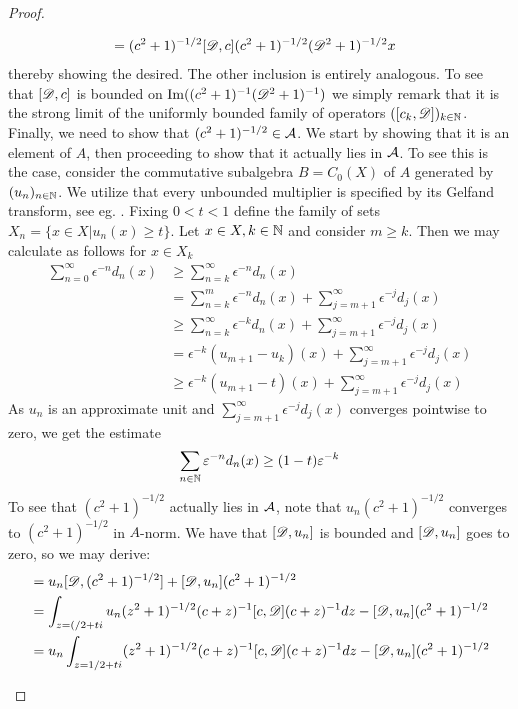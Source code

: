 \begin{proof}
\begin{itemize}
\begin{align*}
			&=(c^2+1)^{-1/2}[\mathscr{D},c](c^2+1)^{-1/2}(\mathscr{D}^2+1)^{-1/2}x
		\end{align*}
		thereby showing the desired. The other inclusion is entirely analogous. 
		To see that $[\mathscr{D},c]$ is bounded on $\operatorname{Im}((c^2+1)^{-1}(\mathscr{D}^2+1)^{-1})$ we simply remark that it is the strong limit of the uniformly bounded family of operators $([c_k,\mathscr{D}])_{k\in \mathbb{N}}$.
		Finally, we need to show that $(c^2+1)^{-1/2}\in \mathcal{A}$. We start by showing that it is an element of $A$, then proceeding to show that it actually lies in $\mathcal{A}$. To see this is the case, consider the commutative subalgebra $B=C_0(X)$ of $A$ generated by $(u_n)_{n\in \mathbb{N}}$. We utilize that every unbounded multiplier is specified by its Gelfand transform, see eg. \cite[Theorem 2.1,Theorem 2.3]{wood}.%
		Fixing $0<t<1$ define the family of sets $X_n=\{x\in X| u_n(x)\geq t\}$. Let $x\in X,k\in \mathbb{N}$ and consider $m\geq k$. Then we may calculate as follows for $x\in X_k$
		\begin{align*}
			\sum_{n=0}^\infty \epsilon^{-n}d_n(x)&\geq \sum_{n=k}^\infty \epsilon^{-n}d_n(x)  \\
			&=\sum_{n=k}^m \epsilon^{-n}d_n(x)+\sum_{j=m+1}^\infty \epsilon^{-j}d_j(x) \\ 
			&\geq \sum_{n=k}^\infty \epsilon^{-k}d_n(x) + \sum_{j=m+1}^\infty \epsilon^{-j}d_j(x)\\
			&=\epsilon^{-k}(u_{m+1}-u_k)(x)+\sum_{j=m+1}^\infty \epsilon^{-j}d_j(x) \\ 
			&\geq \epsilon^{-k}(u_{m+1}-t)(x)+\sum_{j=m+1}^\infty \epsilon^{-j}d_j(x) 
		\end{align*}
		As $u_n$ is an approximate unit and $\sum_{j=m+1}^\infty \epsilon^{-j}d_j(x) $ converges pointwise to zero, we get the estimate 
		\begin{align*}
			\sum_{n\in \mathbb{N}} \varepsilon^{-n} d_n(x)\geq (1-t)\varepsilon^{-k}
		\end{align*}
		To see that $(c^2+1)^{-1/2}$ actually lies in $\mathcal{A}$, note that $u_n(c^2+1)^{-1/2}$ converges to $(c^2+1)^{-1/2}$ in $A$-norm. We have that $[\mathscr{D},u_n]$ is bounded and $[\mathscr{D},u_n]$ goes to zero, so we may derive:
		\begin{align*}
			[\D,u_n(c^2+1)^{-1/2}]&=u_n[\D,(c^2+1)^{-1/2}]+[\D,u_n](c^2+1)^{-1/2} \\
			&=\int_{z=(/2+ti} u_n (z^2+1)^{-1/2} (c+z)^{-1}[c,\D](c+z)^{-1} dz -[\D,u_n](c^2+1)^{-1/2} \\
			&=u_n\int_{z=1/2+ti} (z^2+1)^{-1/2} (c+z)^{-1}[c,\D](c+z)^{-1} dz -[\D,u_n](c^2+1)^{-1/2} 

\end{align*}
\end{itemize}
\end{proof}
